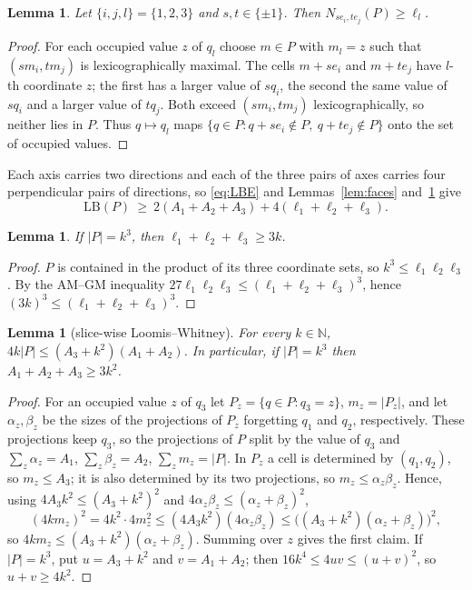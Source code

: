 \documentclass[11pt]{amsart}
\theoremstyle{plain}
\newtheorem{lemma}[theorem]{Lemma}
\theoremstyle{definition}
\newcommand{\N}{\mathbb{N}}
\newcommand{\LB}{\mathrm{LB}}
\begin{document}
\begin{lemma}\label{lem:edges}
Let $\{i,j,l\}=\{1,2,3\}$ and $s,t\in\{\pm1\}$. Then $N_{se_i,te_j}(P)\ge\ell_l$.
\end{lemma}

\begin{proof}
For each occupied value $z$ of $q_l$ choose $m\in P$ with $m_l=z$ such that $(sm_i,tm_j)$ is lexicographically maximal. The cells $m+se_i$ and $m+te_j$ have $l$-th coordinate $z$; the first has a larger value of $sq_i$, the second the same value of $sq_i$ and a larger value of $tq_j$. Both exceed $(sm_i,tm_j)$ lexicographically, so neither lies in $P$. Thus $q\mapsto q_l$ maps $\{q\in P:q+se_i\notin P,\ q+te_j\notin P\}$ onto the set of occupied values.
\end{proof}

Each axis carries two directions and each of the three pairs of axes carries four perpendicular pairs of directions, so \eqref{eq:LBE} and Lemmas~\ref{lem:faces} and~\ref{lem:edges} give
\begin{equation}\label{eq:proj}
\LB(P)\ \ge\ 2(A_1+A_2+A_3)+4(\ell_1+\ell_2+\ell_3).
\end{equation}

\begin{lemma}\label{lem:slices}
If $|P|=k^3$, then $\ell_1+\ell_2+\ell_3\ge3k$.
\end{lemma}

\begin{proof}
$P$ is contained in the product of its three coordinate sets, so $k^3\le\ell_1\ell_2\ell_3$. By the AM--GM inequality $27\ell_1\ell_2\ell_3\le(\ell_1+\ell_2+\ell_3)^3$, hence $(3k)^3\le(\ell_1+\ell_2+\ell_3)^3$.
\end{proof}

\begin{lemma}[slice-wise Loomis--Whitney]\label{lem:LW}
For every $k\in\N$, $4k|P|\le(A_3+k^2)(A_1+A_2)$. In particular, if $|P|=k^3$ then $A_1+A_2+A_3\ge3k^2$.
\end{lemma}

\begin{proof}
For an occupied value $z$ of $q_3$ let $P_z=\{q\in P:q_3=z\}$, $m_z=|P_z|$, and let $\alpha_z,\beta_z$ be the sizes of the projections of $P_z$ forgetting $q_1$ and $q_2$, respectively. These projections keep $q_3$, so the projections of $P$ split by the value of $q_3$ and $\sum_z\alpha_z=A_1$, $\sum_z\beta_z=A_2$, $\sum_z m_z=|P|$. In $P_z$ a cell is determined by $(q_1,q_2)$, so $m_z\le A_3$; it is also determined by its two projections, so $m_z\le\alpha_z\beta_z$. Hence, using $4A_3k^2\le(A_3+k^2)^2$ and $4\alpha_z\beta_z\le(\alpha_z+\beta_z)^2$,
\[
(4km_z)^2=4k^2\cdot4m_z^2\le(4A_3k^2)(4\alpha_z\beta_z)\le\bigl((A_3+k^2)(\alpha_z+\beta_z)\bigr)^2,
\]
so $4km_z\le(A_3+k^2)(\alpha_z+\beta_z)$. Summing over $z$ gives the first claim. If $|P|=k^3$, put $u=A_3+k^2$ and $v=A_1+A_2$; then $16k^4\le4uv\le(u+v)^2$, so $u+v\ge4k^2$.
\end{proof}
\end{document}
